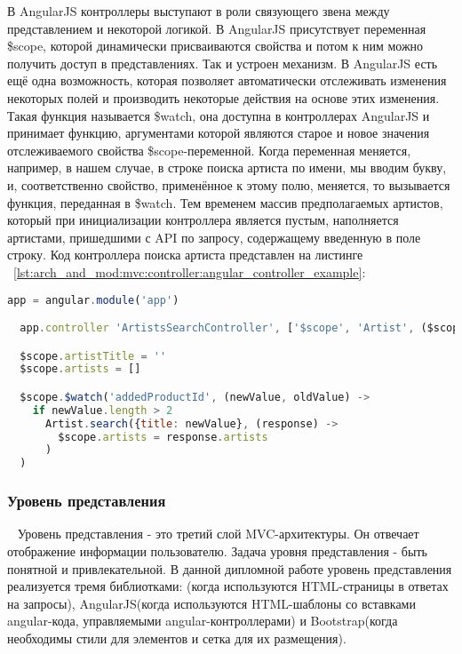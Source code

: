 В AngularJS контроллеры выступают в роли связующего звена между представлением и некоторой логикой. В AngularJS присутствует переменная \$scope, которой динамически присваиваются свойства и потом к ним можно получить доступ в представлениях. Так и устроен механизм. В AngularJS есть ещё одна возможность, которая позволяет автоматически отслеживать изменения некоторых полей и производить некоторые действия на основе этих изменения. Такая функция называется \$watch, она доступна в контроллерах AngularJS и принимает функцию, аргументами которой являются старое и новое значения отслеживаемого свойства \$scope-переменной. Когда переменная меняется, например, в нашем случае, в строке поиска артиста по имени, мы вводим букву, и, соответственно свойство, применённое к этому полю, меняется, то вызывается функция, переданная в \$watch. Тем временем массив предполагаемых артистов, который при инициализации контроллера является пустым, наполняется артистами, пришедшими с API по запросу, содержащему введенную в поле строку. Код контроллера поиска артиста представлен на листинге ~\ref{lst:arch_and_mod:mvc:controller:angular_controller_example}:

\begin{lstlisting}[language=JavaScript,caption={Пример получения артистов по определённым параметрам}, label=lst:arch_and_mod:mvc:controller:angular_controller_example]
  app = angular.module('app')

  app.controller 'ArtistsSearchController', ['$scope', 'Artist', ($scope, Artist) ->

  $scope.artistTitle = ''
  $scope.artists = []

  $scope.$watch('addedProductId', (newValue, oldValue) ->
    if newValue.length > 2
      Artist.search({title: newValue}, (response) ->
        $scope.artists = response.artists
      )
  )
\end{lstlisting}

\subsubsection{Уровень представления}
\label{sub:arch_and_mod:mvc:view}
~\newline
\indent Уровень представления - это третий слой MVC-архитектуры. Он отвечает отображение информации пользователю. Задача уровня представления - быть понятной и привлекательной. В данной дипломной работе уровень представления реализуется тремя библиотками: \ror{}(когда используются HTML-страницы в ответах на запросы), AngularJS(когда используются HTML-шаблоны со вставками angular-кода, управляемыми angular-контроллерами) и Bootstrap(когда необходимы стили для элементов и сетка для их размещения).

